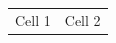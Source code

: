 ﻿\documentclass[10pt]{article}
\begin{document}
\begin{tabularx}{\linewidth}{|p{3cm}|X|}
\hline
\rowcolor{navy}\multicolumn{2}{|l|}{\color{white}\textbf{Header}} \\
\hline
Cell 1 & Cell 2 \\
\hline
\end{tabularx}
\end{document}
